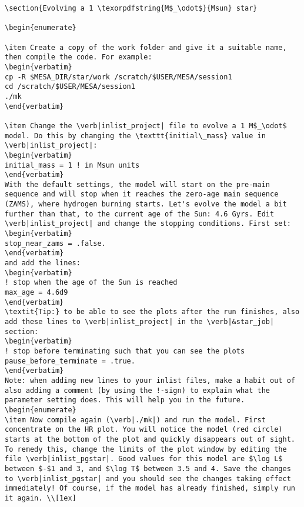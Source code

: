 \documentclass[11pt,a4paper]{article}
\begin{document}
\begin{lstlisting}
\section{Evolving a 1 \texorpdfstring{M$_\odot$}{Msun} star}

\begin{enumerate}

\item Create a copy of the work folder and give it a suitable name, then compile the code. For example:
\begin{verbatim}
cp -R $MESA_DIR/star/work /scratch/$USER/MESA/session1
cd /scratch/$USER/MESA/session1
./mk
\end{verbatim}

\item Change the \verb|inlist_project| file to evolve a 1 M$_\odot$ model. Do this by changing the \texttt{initial\_mass} value in \verb|inlist_project|:
\begin{verbatim}
initial_mass = 1 ! in Msun units
\end{verbatim}
With the default settings, the model will start on the pre-main sequence and will stop when it reaches the zero-age main sequence (ZAMS), where hydrogen burning starts. Let's evolve the model a bit further than that, to the current age of the Sun: 4.6 Gyrs. Edit \verb|inlist_project| and change the stopping conditions. First set:
\begin{verbatim}
stop_near_zams = .false.
\end{verbatim}
and add the lines:
\begin{verbatim}
! stop when the age of the Sun is reached
max_age = 4.6d9
\end{verbatim}
\textit{Tip:} to be able to see the plots after the run finishes, also add these lines to \verb|inlist_project| in the \verb|&star_job| section:
\begin{verbatim}
! stop before terminating such that you can see the plots
pause_before_terminate = .true.
\end{verbatim}
Note: when adding new lines to your inlist files, make a habit out of also adding a comment (by using the !-sign) to explain what the parameter setting does. This will help you in the future.
\begin{enumerate}
\item Now compile again (\verb|./mk|) and run the model. First concentrate on the HR plot. You will notice the model (red circle) starts at the bottom of the plot and quickly disappears out of sight. To remedy this, change the limits of the plot window by editing the file \verb|inlist_pgstar|. Good values for this model are $\log L$ between $-$1 and 3, and $\log T$ between 3.5 and 4. Save the changes to \verb|inlist_pgstar| and you should see the changes taking effect immediately! Of course, if the model has already finished, simply run it again. \\[1ex]

\end{lstlisting}
\end{document}
